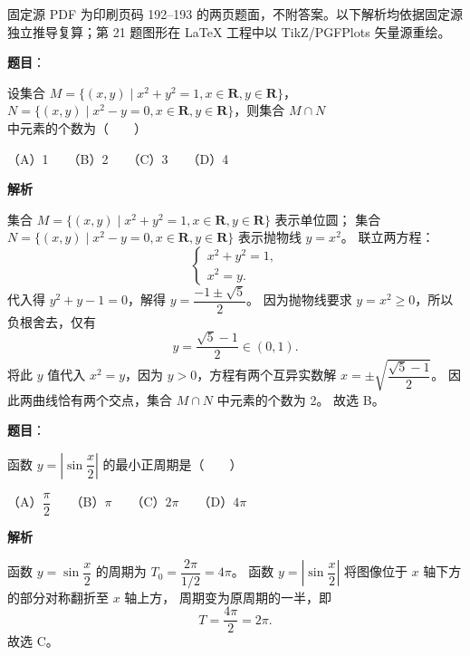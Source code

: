 

\begin{gktip}
固定源 PDF 为印刷页码 192–193 的两页题面，不附答案。以下解析均依据固定源独立推导复算；第 21 题图形在 LaTeX 工程中以 TikZ/PGFPlots 矢量源重绘。
\end{gktip}

\begin{answer}

\textbf{题目}：

设集合 $M=\{(x,y)\mid x^2+y^2=1,x\in\mathbf{R},y\in\mathbf{R}\}$，$N=\{(x,y)\mid x^2-y=0,x\in\mathbf{R},y\in\mathbf{R}\}$，则集合 $M\cap N$ 中元素的个数为\mbox{（　　）}

（A）1　　（B）2　　（C）3　　（D）4

\textbf{解析}

集合 $M=\{(x,y)\mid x^2+y^2=1,x\in\mathbf{R},y\in\mathbf{R}\}$ 表示单位圆；
集合 $N=\{(x,y)\mid x^2-y=0,x\in\mathbf{R},y\in\mathbf{R}\}$ 表示抛物线 $y=x^2$。
联立两方程：
\nopagebreak[4]
\[
\begin{cases}
x^2+y^2=1,\\
x^2=y.
\end{cases}
\]
代入得 $y^2+y-1=0$，解得 $y=\dfrac{-1\pm\sqrt{5}}{2}$。
因为抛物线要求 $y=x^2\geqslant 0$，所以负根舍去，仅有
\nopagebreak[4]
\[
y=\frac{\sqrt{5}-1}{2}\in(0,1).
\]
将此 $y$ 值代入 $x^2=y$，因为 $y>0$，方程有两个互异实数解 $x=\pm\sqrt{\dfrac{\sqrt{5}-1}{2}}$。
因此两曲线恰有两个交点，集合 $M\cap N$ 中元素的个数为 2。
故选 B。


\end{answer}
\begin{answer}

\textbf{题目}：

函数 $y=\left|\sin\dfrac{x}{2}\right|$ 的最小正周期是\mbox{（　　）}

（A）$\dfrac{\pi}{2}$　　（B）$\pi$　　（C）$2\pi$　　（D）$4\pi$

\textbf{解析}

函数 $y=\sin\dfrac{x}{2}$ 的周期为 $T_0=\dfrac{2\pi}{1/2}=4\pi$。
函数 $y=\left|\sin\dfrac{x}{2}\right|$ 将图像位于 $x$ 轴下方的部分对称翻折至 $x$ 轴上方，
周期变为原周期的一半，即
\nopagebreak[4]
\[
T=\frac{4\pi}{2}=2\pi.
\]
故选 C。


\end{answer}
